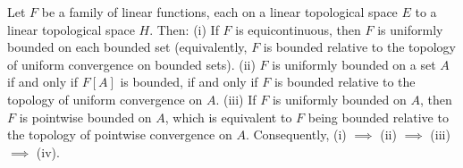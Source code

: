Let $F$ be a family of linear functions, each on a linear topological space $E$ to a linear topological space $H$. Then:
(i) If $F$ is equicontinuous, then $F$ is uniformly bounded on each bounded set (equivalently, $F$ is bounded relative to the topology of uniform convergence on bounded sets).
(ii) $F$ is uniformly bounded on a set $A$ if and only if $F[A]$ is bounded, if and only if $F$ is bounded relative to the topology of uniform convergence on $A$.
(iii) If $F$ is uniformly bounded on $A$, then $F$ is pointwise bounded on $A$, which is equivalent to $F$ being bounded relative to the topology of pointwise convergence on $A$.
Consequently, (i) $\implies$ (ii) $\implies$ (iii) $\implies$ (iv).
